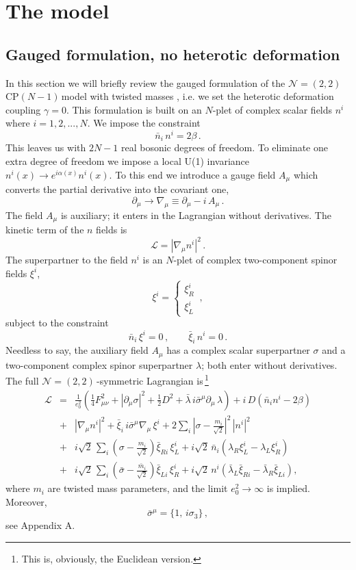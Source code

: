 \documentclass[epsfig,12pt]{article}
\def\beq{\begin{equation}}
\def\eeq{\end{equation}}
\def\beqn{\begin{eqnarray}}
\def\eeqn{\end{eqnarray}}
\newcommand{\ntt}{${\mathcal N}=(2,2)\,$}
\newcommand{\cpn}{CP$(N-1)\,$}
\newcommand{\cell}{{\mathcal L}}
\newcommand{\pt}{\partial}
\def\beqn{\begin{eqnarray}}
\def\eeqn{\end{eqnarray}}
\def\beq{\begin{equation}}
\def\eeq{\end{equation}}
\begin{document}
\section{The model}
\label{mmod}
\setcounter{equation}{0}

\subsection{Gauged formulation, no heterotic deformation}

In this section we will briefly review the gauged formulation \cite{W79,W93} of
the \mbox{\ntt} \cpn model with twisted masses
\cite{twisted}, i.e. we set the heterotic deformation coupling
$\gamma = 0$.
This formulation is built on an $N$-plet of complex scalar fields $n^i$ where $i=1,2,...,N$.
We impose the constraint
\beq
\bar n_i \,n^i = 2\beta \,.
\label{m31}
\eeq
This leaves us with $2N-1$ real bosonic degrees of freedom. To eliminate one extra degree
of freedom we impose a local U(1) invariance $n^i(x)\to e^{i\alpha(x)} n^i(x)$.
To this end we introduce a gauge field $A_\mu$ which converts the partial derivative into the
covariant one,
\beq
\partial_\mu\to \nabla_\mu \equiv \partial_\mu -i\,  A_\mu\,.
\label{m32}
\eeq
The field $A_\mu$ is auxiliary; it enters in the Lagrangian without derivatives. The kinetic term of the
$n$ fields is
\beq
\cell  = \left|\nabla_\mu n^i\right|^2\,.
\label{m33}
\eeq
The superpartner to the field $n^i$ is an $N$-plet of complex two-component spinor fields $\xi^i$,
\beq
\xi^i =\left\{\begin{array}{l}
\xi^i_R\\[2mm]
\xi^i_L
\end{array}
\right.\,,
\label{m34}
\eeq
subject to the constraint
\beq
\bar{n}_i\,\xi^i =0\,,\qquad \bar\xi_i\,n^i = 0\,.
\label{npxi}
\eeq
Needless to say, the auxiliary field $A_\mu$ has a complex scalar superpartner $\sigma$ 
and a two-component complex spinor superpartner $\lambda$; both enter without derivatives.
The full \ntt-symmetric Lagrangian is\,\footnote{This is, obviously, the Euclidean version.}
\beqn
\cell &=& 
\frac{1}{e_0^2}\left(\frac{1}{4} F_{\mu\nu}^2 +\left|\pt_\mu\sigma\right|^2 + \frac{1}{2}D^2
+\bar\lambda \, i\bar{\sigma}^\mu\pt_\mu\,\lambda
\right) + i\,D\left(\bar{n}_i n^i -2\beta
\right)
\nonumber\\[3mm]
&+&
\left|\nabla_\mu n^i\right|^2+ \bar{\xi}_i\, i\bar{\sigma}^\mu\nabla_\mu\,\xi^i
+ 2\sum_i\left|\sigma-\frac{m_i}{\sqrt 2}\right|^2\, |n^i|^2
\nonumber\\[3mm]
&+&
i\sqrt{2}\,\sum_i \left( \sigma -\frac{m_i}{\sqrt 2}\right)\bar\xi_{Ri}\, \xi^i_L +i\sqrt{2}\,\bar{n}_i
\left(\lambda_R\xi^i_L - \lambda_L\xi^i_R
\right)
\nonumber\\
&+&
i\sqrt{2}\,\sum_i \left( \bar\sigma -\frac{\bar{m}_i}{\sqrt 2}\right)\bar\xi_{Li}\, \xi^i_R +i\sqrt{2}\,{n}^i
\left(\bar\lambda_L\bar\xi_{Ri} - \bar\lambda_R\bar\xi_{Li}
\right),
\label{bee31}
\eeqn
where $m_i$ are twisted mass parameters, and the limit $e_0^2\to\infty$ is implied. 
Moreover,
\beq
\bar\sigma^\mu = \{1,\,i\sigma_3\}\,,
\label{wtpi3}
\eeq
see Appendix A.
\end{document}
